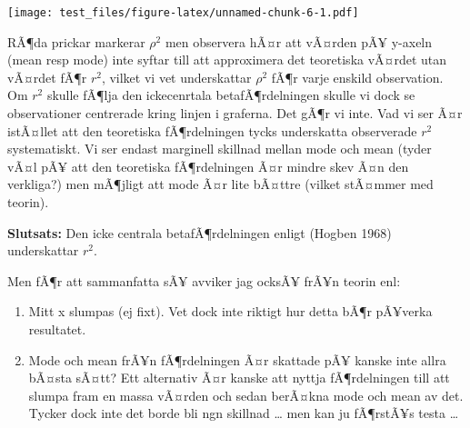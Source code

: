\documentclass[]{article}
\newenvironment{Shaded}{\begin{snugshade}}{\end{snugshade}}
\newcommand{\KeywordTok}[1]{\textcolor[rgb]{0.13,0.29,0.53}{\textbf{{#1}}}}
\newcommand{\DataTypeTok}[1]{\textcolor[rgb]{0.13,0.29,0.53}{{#1}}}
\newcommand{\DecValTok}[1]{\textcolor[rgb]{0.00,0.00,0.81}{{#1}}}
\newcommand{\FloatTok}[1]{\textcolor[rgb]{0.00,0.00,0.81}{{#1}}}
\newcommand{\StringTok}[1]{\textcolor[rgb]{0.31,0.60,0.02}{{#1}}}
\newcommand{\CommentTok}[1]{\textcolor[rgb]{0.56,0.35,0.01}{\textit{{#1}}}}
\newcommand{\NormalTok}[1]{{#1}}
\providecommand{\tightlist}{%
  \setlength{\itemsep}{0pt}\setlength{\parskip}{0pt}}
\begin{document}
\texttt{[image: test\_files/figure-latex/unnamed-chunk-6-1.pdf]}

RÃ¶da prickar markerar \(\rho^2\) men observera hÃ¤r att vÃ¤rden pÃ¥
y-axeln (mean resp mode) inte syftar till att approximera det teoretiska
vÃ¤rdet utan vÃ¤rdet fÃ¶r \(r^2\), vilket vi vet underskattar \(\rho^2\)
fÃ¶r varje enskild observation. Om \(r^2\) skulle fÃ¶lja den
ickecenrtala betafÃ¶rdelningen skulle vi dock se observationer
centrerade kring linjen i graferna. Det gÃ¶r vi inte. Vad vi ser Ã¤r
istÃ¤llet att den teoretiska fÃ¶rdelningen tycks underskatta observerade
\(r^2\) systematiskt. Vi ser endast marginell skillnad mellan mode och
mean (tyder vÃ¤l pÃ¥ att den teoretiska fÃ¶rdelningen Ã¤r mindre skev
Ã¤n den verkliga?) men mÃ¶jligt att mode Ã¤r lite bÃ¤ttre (vilket
stÃ¤mmer med teorin).

\textbf{Slutsats:} Den icke centrala betafÃ¶rdelningen enligt (Hogben
1968) underskattar \(r^2\).

Men fÃ¶r att sammanfatta sÃ¥ avviker jag ocksÃ¥ frÃ¥n teorin enl:

\begin{enumerate}
\def\labelenumi{\arabic{enumi}.}
\tightlist
\item
  Mitt x slumpas (ej fixt). Vet dock inte riktigt hur detta bÃ¶r
  pÃ¥verka resultatet.
\item
  Mode och mean frÃ¥n fÃ¶rdelningen Ã¤r skattade pÃ¥ kanske inte allra
  bÃ¤sta sÃ¤tt? Ett alternativ Ã¤r kanske att nyttja fÃ¶rdelningen till
  att slumpa fram en massa vÃ¤rden och sedan berÃ¤kna mode och mean av
  det. Tycker dock inte det borde bli ngn skillnad \ldots{} men kan ju
  fÃ¶rstÃ¥s testa \ldots{}
\end{enumerate}

\begin{Shaded}
\end{Shaded}
\end{document}
